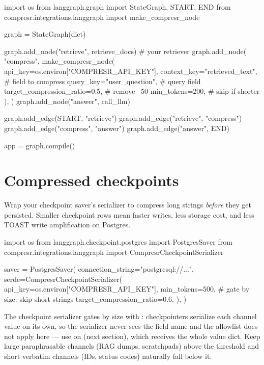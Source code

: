 \documentclass[10pt]{article}
\begin{document}
\begin{pycode}
import os
from langgraph.graph import StateGraph, START, END
from compresr.integrations.langgraph import make_compresr_node

graph = StateGraph(dict)

graph.add_node("retrieve", retrieve_docs)         # your retriever
graph.add_node(
    "compress",
    make_compresr_node(
        api_key=os.environ["COMPRESR_API_KEY"],
        context_key="retrieved_text",             # field to compress
        query_key="user_question",                # query field
        target_compression_ratio=0.5,             # remove ~50%
        min_tokens=200,                           # skip if shorter
    ),
)
graph.add_node("answer", call_llm)

graph.add_edge(START, "retrieve")
graph.add_edge("retrieve", "compress")
graph.add_edge("compress", "answer")
graph.add_edge("answer", END)

app = graph.compile()
\end{pycode}

\section{Compressed checkpoints}

Wrap your checkpoint saver's serializer to compress long strings
\emph{before} they get persisted. Smaller checkpoint rows mean faster
writes, less storage cost, and less TOAST write amplification on Postgres.

\begin{pycode}
import os
from langgraph.checkpoint.postgres import PostgresSaver
from compresr.integrations.langgraph import CompresrCheckpointSerializer

saver = PostgresSaver(
    connection_string="postgresql://...",
    serde=CompresrCheckpointSerializer(
        api_key=os.environ["COMPRESR_API_KEY"],
        min_tokens=500,                 # gate by size: skip short strings
        target_compression_ratio=0.6,
    ),
)
\end{pycode}

The checkpoint serializer gates by size with :
checkpointers serialize each channel value on its own, so the serializer
never sees the field name and the  allowlist does not
apply here --- use  on 
(next section), which receives the whole value dict. Keep large
paraphrasable channels (RAG dumps, scratchpads) above the threshold and
short verbatim channels (IDs, status codes) naturally fall below it.
\end{document}
